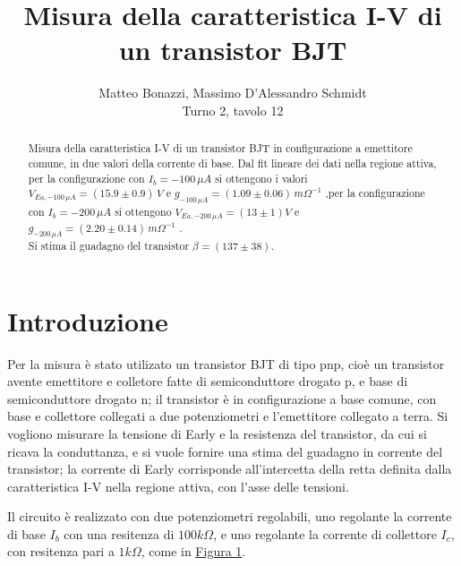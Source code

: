 \documentclass{article}
\title{Misura della caratteristica I-V di un transistor BJT}
\author{Matteo Bonazzi, Massimo D'Alessandro Schmidt\\ Turno 2, tavolo 12}
\begin{document}
\maketitle
\begin{abstract}
    Misura della caratteristica I-V di un transistor BJT in configurazione a emettitore comune, in due valori della corrente di base.\newline
    Dal fit lineare dei dati nella regione attiva, per la configurazione con $I_b=-100 \,\mu A$ si ottengono i valori $V_{Ea,-100 \,\mu A}=(15.9\pm 0.9) \,V$ e ${g_{-100 \,\mu A}=(1.09 \pm 0.06)\, m\Omega^{-1}}$ ,per la configurazione con $I_b=-200 \,\mu A$ si ottengono $V_{Ea,-200 \,\mu A}=(13\pm 1) V $ e ${g_{-200 \,\mu A}=(2.20 \pm 0.14) \, m\Omega^{-1}}$ .\\
    Si stima il guadagno del transistor $\beta=(137\pm38)$.\\
\end{abstract}
\tableofcontents
\newpage
\section{Introduzione}
Per la misura è stato utilizato un transistor BJT di tipo pnp, cioè un transistor avente emettitore e colletore fatte di semiconduttore drogato p, e base di semiconduttore drogato n; il transistor è in configurazione a base comune, con base
e collettore collegati a due potenziometri e l'emettitore collegato a terra. Si vogliono misurare la tensione di Early e la resistenza del transistor, da cui si ricava la conduttanza, e si vuole fornire una stima del guadagno in corrente del transistor;
la corrente di Early corrisponde all'intercetta della retta definita dalla caratteristica I-V nella regione attiva, con l'asse delle tensioni.\par
Il circuito è realizzato con due potenziometri regolabili, uno regolante la corrente di base $I_b$ con una resitenza di $100k\Omega$, e uno regolante
la corrente di collettore $I_c$, con resitenza pari a $1k\Omega$, come in \hyperref[fig:circuito]{Figura 1}.\par
\end{document}
